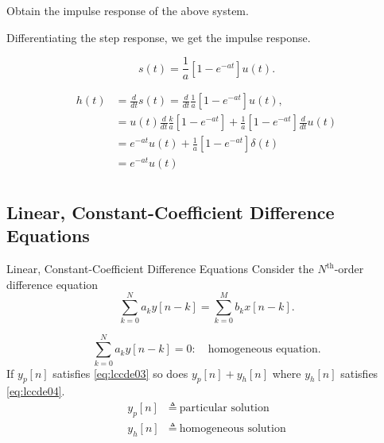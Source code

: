 \begin{frame}
    Obtain the impulse response of the above system.\pause
    {
        Differentiating the step response, we get the impulse response.
        \begin{figure}
            
        \end{figure}

        \begin{equation*}
            s(t) = \frac{1}{a}\left[1-e^{-at}\right]u(t).
        \end{equation*}

        \begin{equation*}
            \begin{split}
                h(t) &= \frac{d}{dt} s(t) = \frac{d}{dt}\frac{1}{a}\left[1-e^{-at}\right]u(t),\\
                &= u(t)\frac{d}{dt} \frac{k}{a}\left[1-e^{-at}\right] + \frac{1}{a}\left[1-e^{-at}\right]\frac{d}{dt}u(t)\\
                &= e^{-at}u(t) + \frac{1}{a}\left[1-e^{-at}\right]\delta(t)\\
                &=  e^{-at}u(t)\\
            \end{split}
        \end{equation*}

    }
\end{frame}


\subsection{Linear, Constant-Coefficient Difference Equations}

\begin{frame}{Linear, Constant-Coefficient Difference Equations}
    Consider the $N^\mathrm{th}$-order difference equation
    \begin{equation}\label{eq:lccde03}
        \sum_{k=0}^{N}a_ky[n-k] = \sum_{k=0}^{M}b_kx[n-k].
    \end{equation}

    \begin{equation}\label{eq:lccde04}
        \sum_{k=0}^{N}a_ky[n-k] = 0:\quad \text{homogeneous equation}.
    \end{equation}
    If $y_p[n]$ satisfies \ref{eq:lccde03} so does $y_p[n] + y_h[n]$ where $y_h[n]$ satisfies \ref{eq:lccde04}.
     \begin{align*}
       y_p[n] &\triangleq~\text{particular solution} \\
       y_h[n] &\triangleq~\text{homogeneous solution} \\
     \end{align*}
\end{frame}


